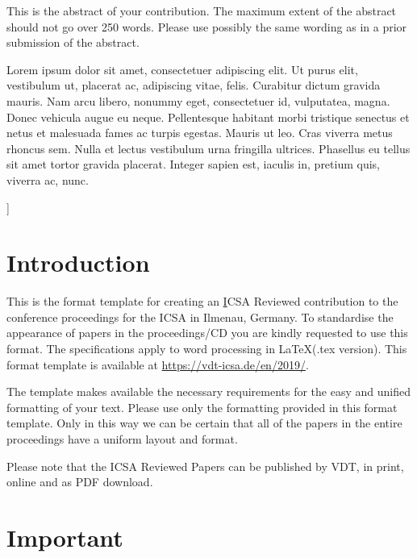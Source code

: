 \documentclass[a4paper, 10pt, twocolumn]{article}
\begin{document}
{\vspace{-3mm}}
\begin{onecolabstract}
{\vspace{3mm}}

This is the abstract of your contribution. The maximum extent of the abstract should not go over 250 words. Please use possibly the same wording as in a prior submission of the abstract. 

Lorem ipsum dolor sit amet, consectetuer adipiscing elit. Ut purus elit, vestibulum ut, placerat ac, adipiscing vitae, felis. Curabitur dictum gravida mauris. Nam arcu libero, nonummy eget, consectetuer id, vulputatea, magna. Donec vehicula augue eu neque. Pellentesque habitant morbi tristique senectus et netus et malesuada fames ac turpis egestas. Mauris ut leo. Cras viverra metus rhoncus sem. Nulla et lectus vestibulum urna fringilla ultrices. Phasellus eu tellus sit amet tortor gravida placerat. Integer sapien est, iaculis in, pretium quis, viverra ac, nunc. 

\end{onecolabstract}
{\vspace{8mm}}]

\section{Introduction} \label{sec:introduction}

This is the format template for creating an {\underline ICSA Reviewed contribution} to the conference proceedings for the ICSA in Ilmenau, Germany. To standardise the appearance of papers in the proceedings/CD you are kindly requested to use this format. The specifications apply to word processing in \LaTeX (.tex version). This format template is available at \textcolor{blue}{\url{https://vdt-icsa.de/en/2019/}}.

The template makes available the necessary requirements for the easy and unified formatting of your text. Please use only the formatting provided in this format template. Only in this way we can be certain that all of the papers in the entire proceedings have a uniform layout and format.

Please note that the ICSA Reviewed Papers can be published by VDT, in print, online and as PDF download.


\section{Important} \label{sec:Important}
\end{document}
